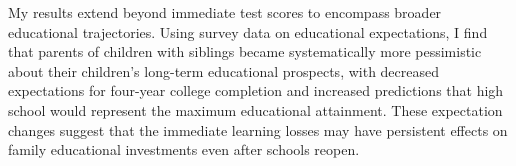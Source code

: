 My results extend beyond immediate test scores to encompass broader educational trajectories. Using survey data on educational expectations, I find that parents of children with siblings became systematically more pessimistic about their children's long-term educational prospects, with decreased expectations for four-year college completion and increased predictions that high school would represent the maximum educational attainment. These expectation changes suggest that the immediate learning losses may have persistent effects on family educational investments even after schools reopen. 




